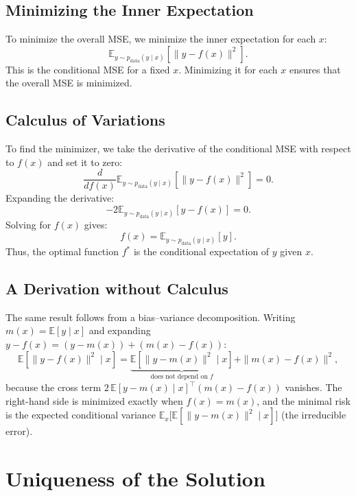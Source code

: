 \begin{notechapter}
\subsection{Minimizing the Inner Expectation}
To minimize the overall MSE, we minimize the inner expectation for each \( x \):
\[
\mathbb{E}_{y \sim p_{\text{data}}(y \mid x)} \left[ \| y - f(x) \|^2 \right].
\]
This is the conditional MSE for a fixed \( x \). Minimizing it for each \( x \) ensures that the overall MSE is minimized.

\subsection{Calculus of Variations}
To find the minimizer, we take the derivative of the conditional MSE with respect to \( f(x) \) and set it to zero:
\[
\frac{d}{df(x)} \mathbb{E}_{y \sim p_{\text{data}}(y \mid x)} \left[ \| y - f(x) \|^2 \right] = 0.
\]
Expanding the derivative:
\[
-2 \mathbb{E}_{y \sim p_{\text{data}}(y \mid x)} [y - f(x)] = 0.
\]
Solving for \( f(x) \) gives:
\[
f(x) = \mathbb{E}_{y \sim p_{\text{data}}(y \mid x)} [y].
\]
Thus, the optimal function \( f^* \) is the conditional expectation of \( y \) given \( x \).

\subsection{A Derivation without Calculus}
The same result follows from a bias--variance decomposition. Writing
\( m(x) = \mathbb{E}[y \mid x] \) and expanding
\( y - f(x) = (y - m(x)) + (m(x) - f(x)) \):
\[
\mathbb{E}\left[ \| y - f(x) \|^2 \mid x \right]
= \underbrace{\mathbb{E}\left[ \| y - m(x) \|^2 \mid x \right]}_{\text{does not depend on } f}
+ \| m(x) - f(x) \|^2 ,
\]
because the cross term \( 2\,\mathbb{E}[y - m(x) \mid x]^\top (m(x) - f(x)) \) vanishes. The
right-hand side is minimized exactly when \( f(x) = m(x) \), and the minimal risk is the
expected conditional variance \( \mathbb{E}_x\big[\mathbb{E}[\| y - m(x) \|^2 \mid x]\big] \)
(the irreducible error).

\section{Uniqueness of the Solution}


\end{notechapter}
